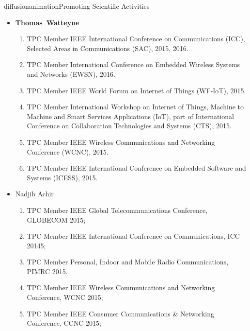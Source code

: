 \documentclass{ra2016}
\newcommand{\thomas}  {\textbf{Thomas~Watteyne}}
\begin{document}
\begin{module}{diffusion}{animation}{Promoting Scientific Activities}
\begin{itemize}
\begin{enumerate}
            \item TPC Member PECCS 2015, 5th international conference on Pervasive and Embedded Computing and Communication Systems, February 2015.
            \item TPC Member RAWSN 2015, 3rd International Workshop on RFID And Adaptive Wireless Sensor Networks, May 2015.
            \item TPC Member RTNS 2015, 23th International Conference on Real-Time and Network Systems, November 2015.
            \item TPC Member WINCOM 2015, 1st International Conference on Wireless Networks and Mobile Communications, October 2015.
        \end{enumerate}
    \item \thomas
        \begin{enumerate}
            \item TPC Member IEEE International Conference on Communications (ICC), Selected Areas in Communications (SAC), 2015, 2016.
            \item TPC Member International Conference on Embedded Wireless Systems and Networks (EWSN), 2016.
            \item TPC Member IEEE World Forum on Internet of Things (WF-IoT), 2015.
            \item TPC Member International Workshop on Internet of Things, Machine to Machine and Smart Services Applications (IoT), part of International Conference on  Collaboration Technologies and Systems (CTS), 2015.
            \item TPC Member IEEE Wireless Communications and Networking Conference (WCNC), 2015.
            \item TPC Member IEEE International Conference on Embedded Software and Systems (ICESS), 2015.
        \end{enumerate}
    \item Nadjib Achir
        \begin{enumerate}
            \item TPC Member IEEE Global Telecommunications Conference, GLOBECOM 2015;
            \item TPC Member IEEE International Conference on Communications, ICC 20145;
            \item TPC Member Personal, Indoor and Mobile Radio Communications, PIMRC 2015.
            \item TPC Member IEEE Wireless Communications and Networking Conference, WCNC 2015;
            \item TPC Member IEEE Consumer Communications \& Networking Conference, CCNC 2015;

\end{enumerate}
\end{itemize}
\end{module}
\end{document}
